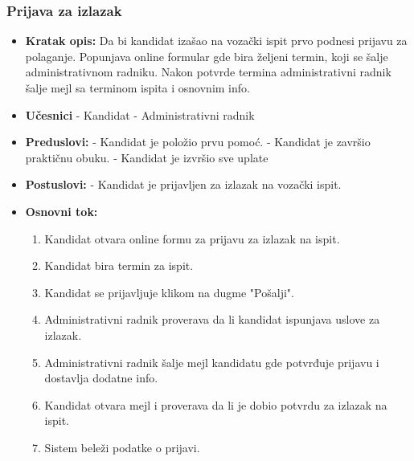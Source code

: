 \subsubsection{Prijava za izlazak}

\vspace{3mm}

\begin{itemize}

\item \textbf{Kratak opis:} Da bi kandidat izašao na vozački ispit prvo podnesi prijavu za polaganje. Popunjava online formular gde bira željeni termin, koji se  šalje administrativnom radniku. Nakon potvrde termina administrativni radnik šalje mejl sa terminom ispita i osnovnim info.

\vspace{2mm}

\item \textbf{Učesnici} \newline
   - Kandidat \newline   
   - Administrativni radnik 
   
\item \textbf{Preduslovi:} \newline
   - Kandidat je položio prvu pomoć. \newline
   - Kandidat je završio praktičnu obuku. \newline
   - Kandidat je izvršio sve uplate

\item \textbf{Postuslovi:} \newline
    - Kandidat je prijavljen za izlazak na vozački ispit.

\item \textbf{Osnovni tok:}  
   \begin{enumerate}
   \item Kandidat otvara online formu za prijavu za izlazak na ispit.
   \item Kandidat bira termin za ispit.
   \item Kandidat se prijavljuje klikom na dugme "Pošalji".
   \item Administrativni radnik proverava da li kandidat ispunjava uslove za izlazak.
   \item Administrativni radnik šalje mejl kandidatu gde potvrđuje prijavu i dostavlja dodatne info.
   \item Kandidat otvara mejl i proverava da li je dobio potvrdu za izlazak na ispit. 
   \item Sistem beleži podatke o prijavi. 
   \end{enumerate}


\end{itemize}
